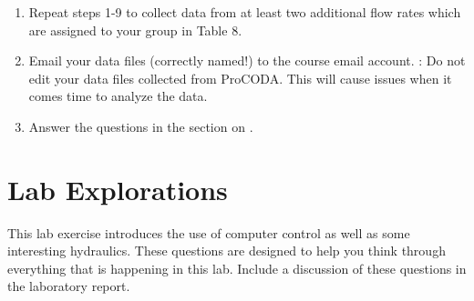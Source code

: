 \documentclass[letterpaper,10pt,english]{sphinxmanual}
\begin{document}
\begin{description}
\begin{enumerate}
\item {} 
Repeat steps 1-9 to collect data from at least two additional flow rates which are assigned to your group in Table 8.

\item {} 
Email your data files (correctly named!) to the course email account. : Do not edit your data files collected from ProCODA. This will cause issues when it comes time to analyze the data.

\item {} 
Answer the questions in the section on {\hyperref[\detokenize{Gas_Transfer/Gas_Transfer:heading-gas-transfer-lab-explorations}]{}}.

\end{enumerate}

\end{description}


\section{Lab Explorations}
\label{\detokenize{Gas_Transfer/Gas_Transfer:lab-explorations}}\label{\detokenize{Gas_Transfer/Gas_Transfer:heading-gas-transfer-lab-explorations}}
This lab exercise introduces the use of computer control as well as some interesting hydraulics. These questions are designed to help you think through everything that is happening in this lab. Include a discussion of these questions in the laboratory report.
\end{document}
